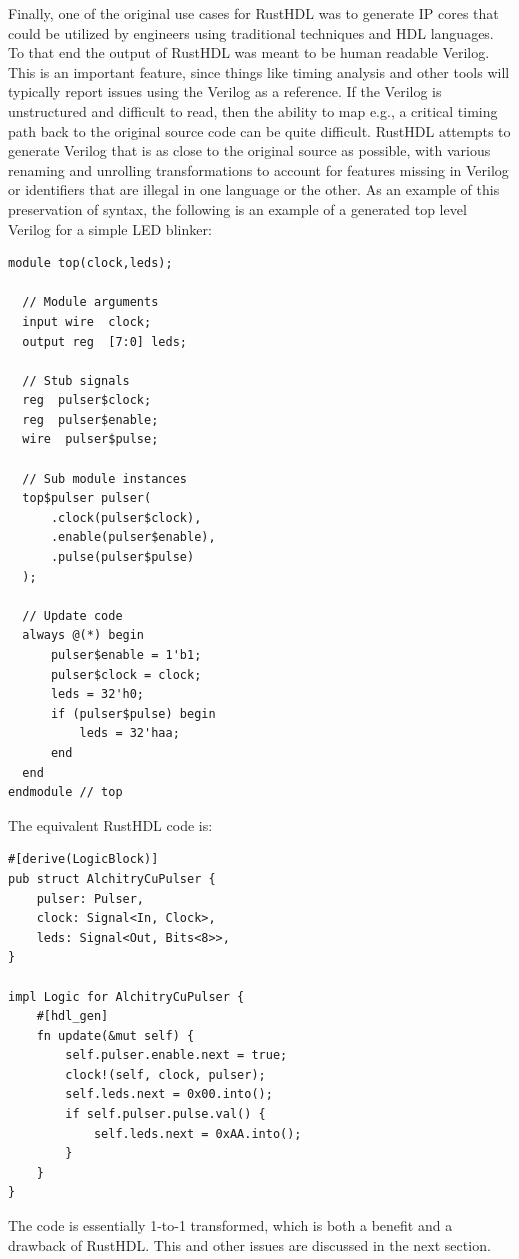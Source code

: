 \documentclass[conference]{IEEEtran}
\begin{document}
Finally, one of the original use cases for RustHDL was to generate IP cores that could be utilized by engineers using traditional 
techniques and HDL languages.  To that end the output of RustHDL was meant to be human readable Verilog.  This is an important 
feature, since things like timing analysis and other tools will typically report issues using the Verilog as a reference.  If the
Verilog is unstructured and difficult to read, then the ability to map e.g., a critical timing path back to the original source 
code can be quite difficult.  RustHDL attempts to generate Verilog that is as close to the original source as possible, with 
various renaming and unrolling transformations to account for features missing in Verilog or identifiers that are illegal in 
one language or the other.  As an example of this preservation of syntax, the following is an example of a generated top level
Verilog for a simple LED blinker:

\begin{verbatim}
module top(clock,leds);
  
  // Module arguments
  input wire  clock;
  output reg  [7:0] leds;
  
  // Stub signals
  reg  pulser$clock;
  reg  pulser$enable;
  wire  pulser$pulse;
  
  // Sub module instances
  top$pulser pulser(
      .clock(pulser$clock),
      .enable(pulser$enable),
      .pulse(pulser$pulse)
  );
  
  // Update code
  always @(*) begin
      pulser$enable = 1'b1;
      pulser$clock = clock;
      leds = 32'h0;
      if (pulser$pulse) begin
          leds = 32'haa;
      end
  end  
endmodule // top
\end{verbatim}

The equivalent RustHDL code is:

\begin{verbatim}
#[derive(LogicBlock)]
pub struct AlchitryCuPulser {
    pulser: Pulser,
    clock: Signal<In, Clock>,
    leds: Signal<Out, Bits<8>>,
}

impl Logic for AlchitryCuPulser {
    #[hdl_gen]
    fn update(&mut self) {
        self.pulser.enable.next = true;
        clock!(self, clock, pulser);
        self.leds.next = 0x00.into();
        if self.pulser.pulse.val() {
            self.leds.next = 0xAA.into();
        }
    }
}
\end{verbatim}

The code is essentially 1-to-1 transformed, which is both a benefit and a drawback of RustHDL.  This and other issues 
are discussed in the next section.
\end{document}
